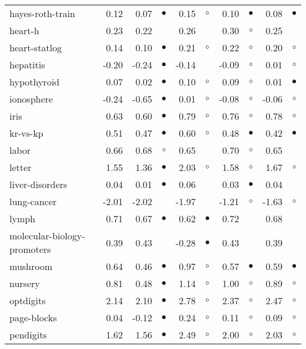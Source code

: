 {\begin{longtable}{lrr@{\hspace{0.1cm}}cr@{\hspace{0.1cm}}cr@{\hspace{0.1cm}}cr@{\hspace{0.1cm}}c}
hayes-roth-train &  0.12 &  0.07 & $\bullet$ &  0.15 &   $\circ$ &  0.10 & $\bullet$ &  0.08 & $\bullet$\\
heart-h &  0.23 &  0.22 &           &  0.26 &           &  0.30 &   $\circ$ &  0.25 &          \\
heart-statlog &  0.14 &  0.10 & $\bullet$ &  0.21 &   $\circ$ &  0.22 &   $\circ$ &  0.20 &   $\circ$\\
hepatitis & -0.20 & -0.24 & $\bullet$ & -0.14 &           & -0.09 &   $\circ$ &  0.01 &   $\circ$\\
hypothyroid &  0.07 &  0.02 & $\bullet$ &  0.10 &   $\circ$ &  0.09 &   $\circ$ &  0.01 & $\bullet$\\
ionosphere & -0.24 & -0.65 & $\bullet$ &  0.01 &   $\circ$ & -0.08 &   $\circ$ & -0.06 &   $\circ$\\
iris &  0.63 &  0.60 & $\bullet$ &  0.79 &   $\circ$ &  0.76 &   $\circ$ &  0.78 &   $\circ$\\
kr-vs-kp &  0.51 &  0.47 & $\bullet$ &  0.60 &   $\circ$ &  0.48 & $\bullet$ &  0.42 & $\bullet$\\
labor &  0.66 &  0.68 &   $\circ$ &  0.65 &           &  0.70 &   $\circ$ &  0.65 &          \\
letter &  1.55 &  1.36 & $\bullet$ &  2.03 &   $\circ$ &  1.58 &   $\circ$ &  1.67 &   $\circ$\\
liver-disorders &  0.04 &  0.01 & $\bullet$ &  0.06 &           &  0.03 & $\bullet$ &  0.04 &          \\
lung-cancer & -2.01 & -2.02 &           & -1.97 &           & -1.21 &   $\circ$ & -1.63 &   $\circ$\\
lymph &  0.71 &  0.67 & $\bullet$ &  0.62 & $\bullet$ &  0.72 &           &  0.68 &          \\
molecular-biology-promoters &  0.39 &  0.43 &           & -0.28 & $\bullet$ &  0.43 &           &  0.39 &          \\
mushroom &  0.64 &  0.46 & $\bullet$ &  0.97 &   $\circ$ &  0.57 & $\bullet$ &  0.59 & $\bullet$\\
nursery &  0.81 &  0.48 & $\bullet$ &  1.14 &   $\circ$ &  1.00 &   $\circ$ &  0.89 &   $\circ$\\
optdigits &  2.14 &  2.10 & $\bullet$ &  2.78 &   $\circ$ &  2.37 &   $\circ$ &  2.47 &   $\circ$\\
page-blocks &  0.04 & -0.12 & $\bullet$ &  0.24 &   $\circ$ &  0.11 &   $\circ$ &  0.09 &   $\circ$\\
pendigits &  1.62 &  1.56 & $\bullet$ &  2.49 &   $\circ$ &  2.00 &   $\circ$ &  2.03 &   $\circ$\\

\end{longtable}}
